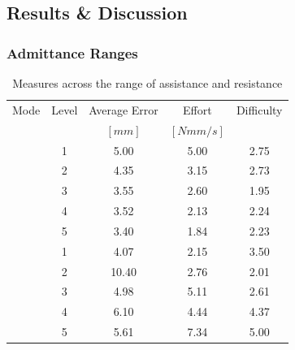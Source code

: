 \documentclass[12pt]{report}
\begin{document}

	
		\subsection{Results \& Discussion} \label{sec:results} 
		
		
	
	\subsubsection{Admittance Ranges}
	
	
	\setlength\arrayrulewidth{1pt}	
	
	\begin{table}[ht] \label{tab:expA}
	\centering
	\caption{Measures across the range of assistance and resistance}
	\begin{tabular}{c c c c c}
	\toprule
	Mode & Level & Average Error & Effort & Difficulty \\
	& & \tiny $[mm]$ & \tiny $[N mm/s]$  & \\
	\midrule
	\cellcolor{white} 						& 1 & 5.00 & 5.00   & 2.75 \\ 
	\rowcolor{gray!10}		
	\cellcolor{white}						& 2 & 4.35 & 3.15  & 2.73 \\ 
	\cellcolor{white}						& 3 & 3.55 & 2.60  & 1.95 \\ 
	\rowcolor{gray!10}
	\cellcolor{white}						& 4 & 3.52 & 2.13  & 2.24 \\ 
	\cellcolor{white}	\multirow{-5}{*}{Assist} 	& 5 & 3.40  & 1.84  & 2.23 \\ 
	\midrule
	\rowcolor{gray!10}
	\cellcolor{white} 						& 1 & 4.07 & 2.15  & 3.50 \\ 
	\cellcolor{white}
	\cellcolor{white}						& 2 & 10.40 & 2.76  & 2.01 \\
	\rowcolor{gray!10}
	\cellcolor{white}						& 3 & 4.98 & 5.11  & 2.61 \\ 
	\cellcolor{white}						& 4 & 6.10 & 4.44  & 4.37 \\ 
	\rowcolor{gray!10}
	\cellcolor{white}	\multirow{-5}{*}{Resist}		& 5 & 5.61 & 7.34  & 5.00 \\ 
	\bottomrule
	\end{tabular}
	\end{table}
	
\end{document}
